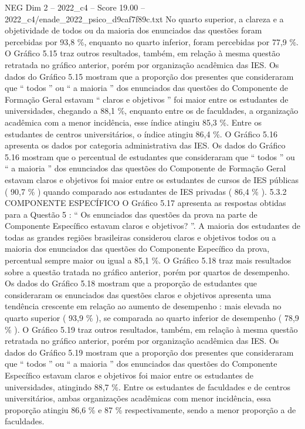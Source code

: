 \begin{textsample}{NEG Dim 2 – 2022\_c4 – Score 19.00 – 2022\_c4/enade\_2022\_psico\_d9caf7f89c.txt}
No quarto superior, a clareza e a objetividade de todos ou da maioria dos enunciados das questões foram percebidas por 93,8 \%, enquanto no quarto inferior, foram percebidas por 77,9 \%.
O Gráfico 5.15 traz outros resultados, também, em relação à mesma questão retratada no gráfico anterior, porém por organização acadêmica das IES.
Os dados do Gráfico 5.15 mostram que a proporção dos presentes que consideraram que “ todos ” ou “ a maioria ” dos enunciados das questões do Componente de Formação Geral estavam “ claros e objetivos ” foi maior entre os estudantes de universidades, chegando a 88,1 \%, enquanto entre os de faculdades, a organização acadêmica com a menor incidência, esse índice atingiu 85,3 \%.
Entre os estudantes de centros universitários, o índice atingiu 86,4 \%.
O Gráfico 5.16 apresenta os dados por categoria administrativa das IES.
Os dados do Gráfico 5.16 mostram que o percentual de estudantes que consideraram que “ todos ” ou “ a maioria ” dos enunciados das questões do Componente de Formação Geral estavam claros e objetivos foi maior entre os estudantes de cursos de IES públicas ( 90,7 \% ) quando comparado aos estudantes de IES privadas ( 86,4 \% ). 5.3.2 COMPONENTE ESPECÍFICO O Gráfico 5.17 apresenta as respostas obtidas para a Questão 5 : “ Os enunciados das questões da prova na parte de Componente Específico estavam claros e objetivos? ”.
A maioria dos estudantes de todas as grandes regiões brasileiras considerou claros e objetivos todos ou a maioria dos enunciados das questões do Componente Específico da prova, percentual sempre maior ou igual a 85,1 \%.
O Gráfico 5.18 traz mais resultados sobre a questão tratada no gráfico anterior, porém por quartos de desempenho.
Os dados do Gráfico 5.18 mostram que a proporção de estudantes que consideraram os enunciados das questões claros e objetivos apresenta uma tendência crescente em relação ao aumento de desempenho : mais elevada no quarto superior ( 93,9 \% ), se comparada ao quarto inferior de desempenho ( 78,9 \% ).
O Gráfico 5.19 traz outros resultados, também, em relação à mesma questão retratada no gráfico anterior, porém por organização acadêmica das IES.
Os dados do Gráfico 5.19 mostram que a proporção dos presentes que consideraram que “ todos ” ou “ a maioria ” dos enunciados das questões do Componente Específico estavam claros e objetivos foi maior entre os estudantes de universidades, atingindo 88,7 \%.
Entre os estudantes de faculdades e de centros universitários, ambas organizações acadêmicas com menor incidência, essa proporção atingiu 86,6 \% e 87 \% respectivamente, sendo a menor proporção a de faculdades.

\end{textsample}
